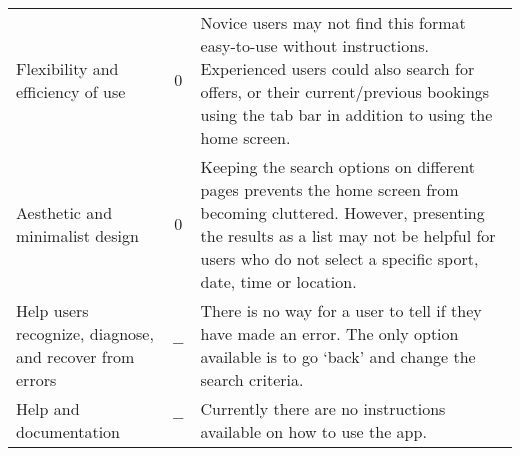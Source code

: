 \begin{center}
\begin{longtable}{p{} c p{}}
		Flexibility and efficiency of use & $0$ & Novice users may not find this
		format easy-to-use without instructions.  Experienced users could also
		search for offers, or their current/previous bookings using the tab bar
		in addition to using the home screen. \\

		Aesthetic and minimalist design & $0$ & Keeping the search options on
		different pages prevents the home screen from becoming cluttered.
		However, presenting the results as a list may not be helpful for users
		who do not select a specific sport, date, time or location.\\

		Help users recognize, diagnose, and recover from errors & $-$ & There
		is no way for a user to tell if they have made an error. The only
		option available is to go `back' and change the search criteria.\\

		Help and documentation & $-$ & Currently there are no instructions
		available on how to use the app.\\
		\bottomrule
	\end{longtable}
\end{center}

